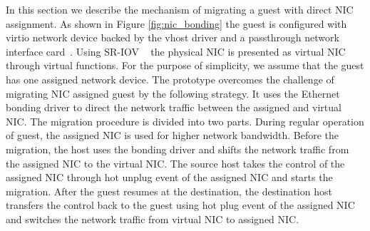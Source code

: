 

In this section we describe the mechanism of migrating a guest
with direct NIC assignment. As shown in Figure 
\ref{fig:nic_bonding} the guest is configured with
virtio network device backed by the vhost driver and a
passthrough network interface card~\cite{zhai:2008}. Using
SR-IOV ~\cite{} the physical NIC is presented as virtual NIC
through virtual functions. For the
purpose of simplicity, we assume that the guest has one
assigned network device. The prototype overcomes the challenge
of migrating NIC assigned guest by the following strategy. It
uses the Ethernet bonding driver to direct the network traffic
between the assigned and virtual NIC. The migration procedure
is divided into two parts. During regular operation of guest,
the assigned NIC is used for higher network bandwidth. Before
the migration, the host uses the bonding driver and shifts the
network traffic from the assigned NIC to the virtual NIC. The 
source host takes the control of the assigned NIC through 
hot unplug event of the assigned NIC and starts the migration. 
After the guest resumes at the destination, the destination host 
transfers the control back to the guest using hot
plug event of the assigned NIC and switches the network traffic 
from virtual NIC to assigned NIC.

%


